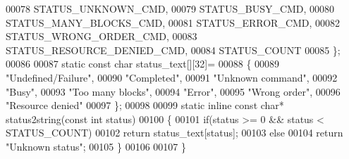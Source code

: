 \begin{DoxyCode}
00078     STATUS_UNKNOWN_CMD,
00079     STATUS_BUSY_CMD,
00080     STATUS_MANY_BLOCKS_CMD,
00081     STATUS_ERROR_CMD,
00082     STATUS_WRONG_ORDER_CMD,
00083     STATUS_RESOURCE_DENIED_CMD,
00084     STATUS_COUNT
00085 \};
00086 
00087 \textcolor{keyword}{static} \textcolor{keyword}{const} \textcolor{keywordtype}{char}  status_text[][32]=
00088 \{
00089     \textcolor{stringliteral}{"Undefined/Failure"},
00090     \textcolor{stringliteral}{"Completed"},
00091     \textcolor{stringliteral}{"Unknown command"},
00092     \textcolor{stringliteral}{"Busy"},
00093     \textcolor{stringliteral}{"Too many blocks"},
00094     \textcolor{stringliteral}{"Error"},
00095     \textcolor{stringliteral}{"Wrong order"},
00096     \textcolor{stringliteral}{"Resource denied"}
00097 \};
00098 
00099 \textcolor{keyword}{static} \textcolor{keyword}{inline} \textcolor{keyword}{const} \textcolor{keywordtype}{char}* status2string(\textcolor{keyword}{const} \textcolor{keywordtype}{int} status)
00100 \{
00101     \textcolor{keywordflow}{if}(status >= 0 && status < STATUS_COUNT)
00102         \textcolor{keywordflow}{return} status\_text[status];
00103     \textcolor{keywordflow}{else}
00104         \textcolor{keywordflow}{return} \textcolor{stringliteral}{"Unknown status"};
00105 \}
00106 
00107 \}
\end{DoxyCode}
